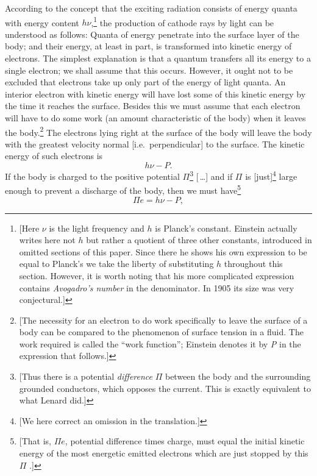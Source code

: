 According to the concept that the exciting radiation consists of energy
quanta with energy content $h\nu$,\footnote{\label{fn:einstein_h}{[}Here $\nu$ is the
  light frequency and $h$ is Planck's constant. Einstein actually
  writes here not $h$ but rather a quotient of three other
  constants, introduced in omitted sections of this paper. Since there
  he shows his own expression to be equal to Planck's we take the
  liberty of substituting $h$ throughout this section. However, it
  is worth noting that his more complicated expression contains
  \emph{Avogadro's number} in the denominator. In 1905 its size was very
  conjectural.{]}} the production of cathode rays by light can be
understood as follows: Quanta of energy penetrate into the surface layer
of the body; and their energy, at least in part, is transformed into
kinetic energy of electrons. The simplest explanation is that a quantum
transfers all its energy to a single electron; we shall assume that this
occurs. However, it ought not to be excluded that electrons take up only
part of the energy of light quanta. An interior electron with kinetic
energy will have lost some of this kinetic energy by the time it reaches
the surface. Besides this we must assume that each electron will have to
do some work (an amount characteristic of the body) when it leaves the
body.\footnote{{[}The necessity for an electron to do work specifically
  to leave the surface of a body can be compared to the phenomenon of
  surface tension in a fluid. The work required is called the ``work
  function''; Einstein denotes it by \emph{P} in the expression that
  follows.{]}} The electrons lying right at the surface of the body will
leave the body with the greatest velocity normal {[}i.e.\
perpendicular{]} to the surface. The kinetic energy of such electrons is
\begin{equation*}
h\nu - P.
\end{equation*}
%
If the body is charged to the positive potential $\Pi$\footnote{{[}Thus
  there is a potential \emph{difference} $\Pi$ between the body and
  the surrounding grounded conductors, which opposes the current. This
  is exactly equivalent to what Lenard did.{]}} [\,\ldots] and if $\Pi$
is {[}just{]}\footnote{{[}We here correct an omission in the
  translation.{]}} large enough to prevent a discharge of the body, then
we must have\footnote{{[}That is, $\Pi e$,
  potential difference times charge, must equal the initial kinetic
  energy of the most energetic emitted electrons which are just stopped
  by this $\Pi$ .{]}}
%
\begin{equation*}
\Pi e = h\nu - P,
\end{equation*}
